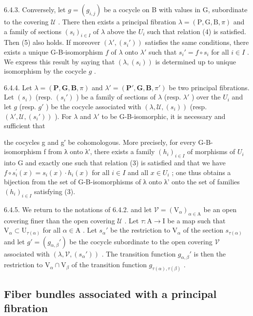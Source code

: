 6.4.3. Conversely, let \(g = (g_{i,j})\) be a cocycle on B with values in G, subordinate to the covering \(\mathcal{U}\) . There then exists a principal fibration \(\lambda = (\mathrm{P},\mathrm{G},\mathrm{B},\pi)\) and a family of sections \((s_i)_{i\in I}\) of \(\lambda\) above the \(U_i\) such that relation (4) is satisfied. Then (5) also holds. If moreover \((\lambda',(s_i'))\) satisfies the same conditions, there exists a unique G-B-isomorphism \(f\) of \(\lambda\) onto \(\lambda'\) such that \(s_i' = f\circ s_i\) for all \(i\in I\) . We express this result by saying that \((\lambda,(s_i))\) is determined up to unique isomorphism by the cocycle \(g\) .

6.4.4. Let \(\lambda = (\mathbf{P}, \mathbf{G}, \mathbf{B}, \pi)\) and \(\lambda' = (\mathbf{P}', \mathbf{G}, \mathbf{B}, \pi')\) be two principal fibrations. Let \((s_i)\) (resp. \((s_i')\) ) be a family of sections of \(\lambda\) (resp. \(\lambda'\) ) over the \(U_i\) and let \(g\) (resp. \(g'\) ) be the cocycle associated with \((\lambda, \mathcal{U}, (s_i))\) (resp. \((\lambda', \mathcal{U}, (s_i'))\) ). For \(\lambda\) and \(\lambda'\) to be G-B-isomorphic, it is necessary and sufficient that

the cocycles g and g′ be cohomologous. More precisely, for every G-B-isomorphism f from λ onto λ′, there exists a family \((h_{i})_{i\in I}\) of morphisms of \(U_{i}\) into G and exactly one such that relation (3) is satisfied and that we have \(f\circ s_{i}^{\prime}(x)=s_{i}(x) \cdot h_{i}(x)\) for all \(i\in I\) and all \(x\in U_{i}\) ; one thus obtains a bijection from the set of G-B-isomorphisms of λ onto λ' onto the set of families \((h_{i})_{i\in I}\) satisfying (3).

6.4.5. We return to the notations of 6.4.2. and let \(\mathcal{V} = (\mathrm{V}_{\alpha})_{\alpha \in \mathrm{A}}\) be an open covering finer than the open covering \(\mathcal{U}\) . Let \(\tau : \mathrm{A} \to \mathrm{I}\) be a map such that \(\mathrm{V}_{\alpha} \subset \mathrm{U}_{\tau(\alpha)}\) for all \(\alpha \in \mathrm{A}\) . Let \(s_{\alpha}'\) be the restriction to \(\mathrm{V}_{\alpha}\) of the section \(s_{\tau(\alpha)}\) and let \(g' = (g_{\alpha,\beta}')\) be the cocycle subordinate to the open covering \(\mathcal{V}\) associated with \((\lambda, \mathcal{V}, (s_{\alpha}'))\) . The transition function \(g_{\alpha,\beta}'\) is then the restriction to \(\mathrm{V}_{\alpha} \cap \mathrm{V}_{\beta}\) of the transition function \(g_{\tau(\alpha),\tau(\beta)}\) .

\subsection{Fiber bundles associated with a principal fibration}

